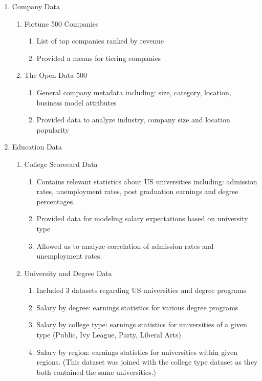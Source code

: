 \begin{enumerate}
	\item Company Data
	\begin{enumerate}
		\item Fortune 500 Companies \cite{fortune500}
		\begin{enumerate}
			\item List of top companies ranked by revenue
			\item Provided a means for tiering companies 
		\end{enumerate}
		\item The Open Data 500 \cite{kaggleCompanies}
		\begin{enumerate}
			\item General company metadata including: size, category, location, business model attributes 
			\item Provided data to analyze industry, company size and location popularity
		\end{enumerate}
	\end{enumerate}
	\item Education Data
	\begin{enumerate}
	\item College Scorecard Data \cite{collegeScorecard}
		\begin{enumerate}
			\item Contains relevant statistics about US universities including: admission rates, unemployment rates, post graduation earnings and degree percentages.
			\item Provided data for modeling salary expectations based on university type
			\item Allowed us to analyze correlation of admission rates and unemployment rates.
		\end{enumerate}
	\item University and Degree Data \cite{kaggleCollege}
		\begin{enumerate}
			\item Included 3 datasets regarding US universities and degree programs
			\item Salary by degree: earnings statistics for various degree programs 
			\item Salary by college type: earnings statistics for universities of a given type (Public, Ivy League, Party, Liberal Arts)
			\item Salary by region: earnings statistics for universities within given regions. (This dataset was joined with the college type dataset as they both contained the same universities.)
		\end{enumerate}

\end{enumerate}
\end{enumerate}
